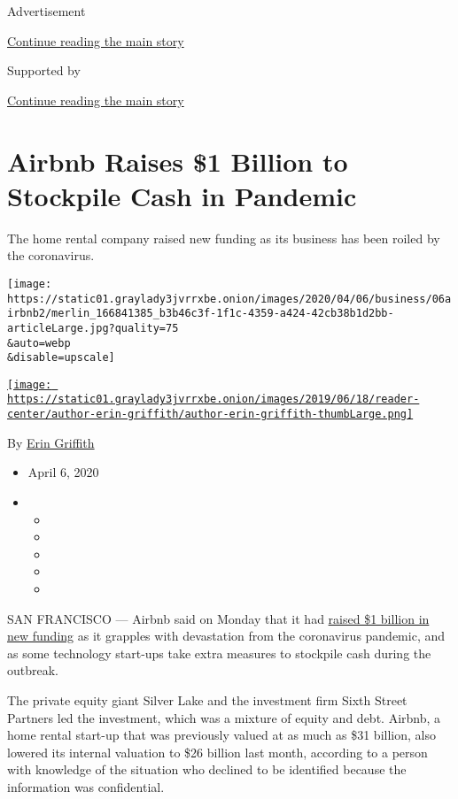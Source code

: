 Advertisement

\protect\hyperlink{after-top}{Continue reading the main story}

Supported by

\protect\hyperlink{after-sponsor}{Continue reading the main story}

\hypertarget{airbnb-raises-1-billion-to-stockpile-cash-in-pandemic}{%
\section{Airbnb Raises \$1 Billion to Stockpile Cash in
Pandemic}\label{airbnb-raises-1-billion-to-stockpile-cash-in-pandemic}}

The home rental company raised new funding as its business has been
roiled by the coronavirus.

\texttt{[image: https://static01.graylady3jvrrxbe.onion/images/2020/04/06/business/06airbnb2/merlin\_166841385\_b3b46c3f-1f1c-4359-a424-42cb38b1d2bb-articleLarge.jpg?quality=75\\\&auto=webp\\\&disable=upscale]}

\href{https://www.nytimes3xbfgragh.onion/by/erin-griffith}{\texttt{[image: https://static01.graylady3jvrrxbe.onion/images/2019/06/18/reader-center/author-erin-griffith/author-erin-griffith-thumbLarge.png]}}

By \href{https://www.nytimes3xbfgragh.onion/by/erin-griffith}{Erin
Griffith}

\begin{itemize}
\item
  April 6, 2020
\item
  \begin{itemize}
  \item
  \item
  \item
  \item
  \item
  \end{itemize}
\end{itemize}

SAN FRANCISCO --- Airbnb said on Monday that it had
\href{https://news.airbnb.com/silver-lake-sixth-street-partners-invest-1-billion-in-airbnb/}{raised
\$1 billion in new funding} as it grapples with devastation from the
coronavirus pandemic, and as some technology start-ups take extra
measures to stockpile cash during the outbreak.

The private equity giant Silver Lake and the investment firm Sixth
Street Partners led the investment, which was a mixture of equity and
debt. Airbnb, a home rental start-up that was previously valued at as
much as \$31 billion, also lowered its internal valuation to \$26
billion last month, according to a person with knowledge of the
situation who declined to be identified because the information was
confidential.

